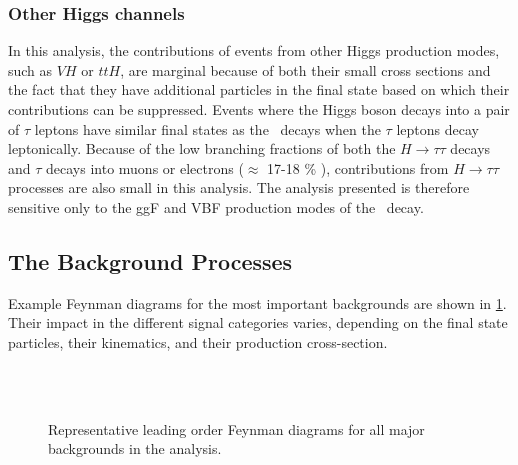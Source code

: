 \subsubsection{Other Higgs channels}
In this analysis, the contributions of \HWW events from other Higgs production modes, such as $VH$ or $ttH$, are marginal because of both their small cross sections and the fact that they have additional particles in the final state based on which their contributions can be suppressed.
Events where the Higgs boson decays into a pair of $\tau$ leptons have similar final states as the \HWWdet\ decays when the $\tau$ leptons decay leptonically. 
Because of the low branching fractions of both the $H \to \tau\tau$ decays and $\tau$ decays into muons or electrons ($\approx$ 17-18 \% \cite{PDG2020}), contributions from $H \to \tau\tau$ processes are also small in this analysis. 
The analysis presented is therefore sensitive only to the ggF and VBF production modes of the \HWWdet\ decay. 

\subsection{The Background Processes}
Example Feynman diagrams for the most important backgrounds are shown in \cref{fig:hww:feyn-bkgs}.
Their impact in the different signal categories varies, depending on the final state particles, their kinematics, and their production cross-section. 
\begin{figure}[ht]
     \hspace{5em}
     \\
     \hspace{5em}
     \\
     \hspace{5em}
    \caption{Representative leading order Feynman diagrams for all major backgrounds in the \HWW analysis.} 
    \label{fig:hww:feyn-bkgs}
\end{figure}

